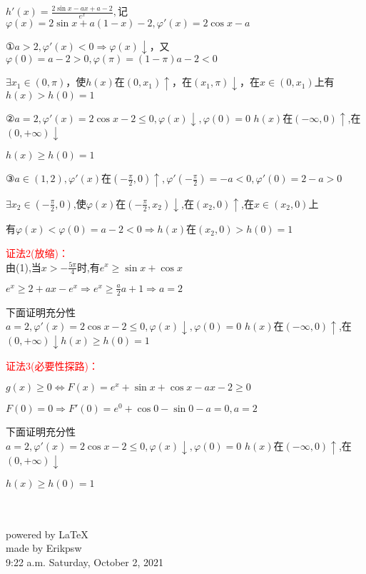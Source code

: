 \documentclass[a4paper,12pt]{article}
\begin{document}
\begin{flushleft}
$h'(x) = \frac{{2\sin x - ax + a - 2}}{{{e^x}}},$记$\varphi (x) = 2\sin x + a(1 - x) - 2,\varphi '(x) = 2\cos x - a$

①$a > 2,\varphi '(x) < 0 \Rightarrow \varphi (x) \downarrow $，又$\varphi (0) = a - 2 > 0,\varphi (\pi ) = (1 - \pi )a - 2 < 0$

$\exists {x_1} \in (0,\pi )$，使$h(x)$在$(0,x_1)\uparrow$，在$(x_1,\pi)\downarrow$，在$x\in(0,x_1)$上有$h(x)>h(0)=1$

②$a = 2,\varphi '(x) = 2\cos x - 2 \le 0,\varphi (x) \downarrow ,\varphi (0) = 0$ $h(x)$在$(-\infty,0)\uparrow$,在$(0,+\infty)\downarrow$

$h(x)\ge h(0)=1$

③$a \in (1,2),\varphi '(x)$在$\left( { - \frac{\pi }{2},0} \right) \uparrow ,\varphi '\left( { - \frac{\pi }{2}} \right) =  - a < 0,\varphi '\left( 0 \right) = 2 - a > 0$

$\exists {x_2} \in \left( { - \frac{\pi }{2},0} \right)$,使$\varphi(x)$在$\left( { - \frac{\pi }{2},x_2} \right)\downarrow$,在$(x_2,0)\uparrow$,在$x\in(x_2,0)$上

有$\varphi(x)<\varphi(0)=a-2<0\Rightarrow h(x)$在$(x_2,0)>h(0)=1$

\textcolor{red}{证法2(放缩)：}\\
由(1),当$x>-\frac{5 \pi}{4} $时,有$e^x \ge \sin x + \cos x $

${e^x} \ge 2 + ax - {e^x} \Rightarrow {e^x} \ge \frac{a}{2}a + 1 \Rightarrow a = 2$

下面证明充分性\\
$a = 2,\varphi '(x) = 2\cos x - 2 \le 0,\varphi (x) \downarrow ,\varphi (0) = 0$ $h(x)$在$(-\infty,0)\uparrow$,在$(0,+\infty)\downarrow h(x)\ge h(0)=1$

\textcolor{red}{证法3(必要性探路)：}

$g(x) \ge 0 \Leftrightarrow F(x) = {e^x} + \sin x + \cos x - ax - 2 \ge 0 $ 

$  F(0) = 0 \Rightarrow F'(0) = {e^0} + \cos 0 - \sin 0 - a = 0,a = 2$

下面证明充分性\\
$a = 2,\varphi '(x) = 2\cos x - 2 \le 0,\varphi (x) \downarrow ,\varphi (0) = 0$ $h(x)$在$(-\infty,0)\uparrow$,在$(0,+\infty)\downarrow$

$h(x)\ge h(0)=1$
\end{flushleft}
\begin{flushright}
~\\
~\\
powered by \LaTeX\\
made by Erikpsw\\
9:22 a.m. Saturday, October 2, 2021
\end{flushright}
\end{document}

